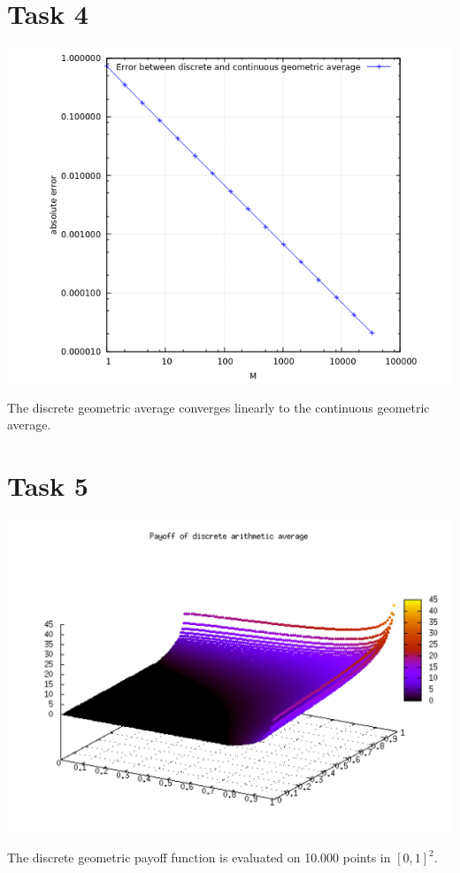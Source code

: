\documentclass[10pt,a4paper]{article}
\begin{document}
\section*{Task 4}

\begin{center}
\includegraphics[scale=0.5]{error_continuous_discrete.png}		
\end{center}
The discrete geometric average converges linearly to the continuous geometric average.

\section*{Task 5}

\begin{center}
\includegraphics[scale=0.5]{s3t5.png}
\end{center}
The discrete geometric payoff function is evaluated on 10.000 points in $[0,1]^2$.
\end{document}
